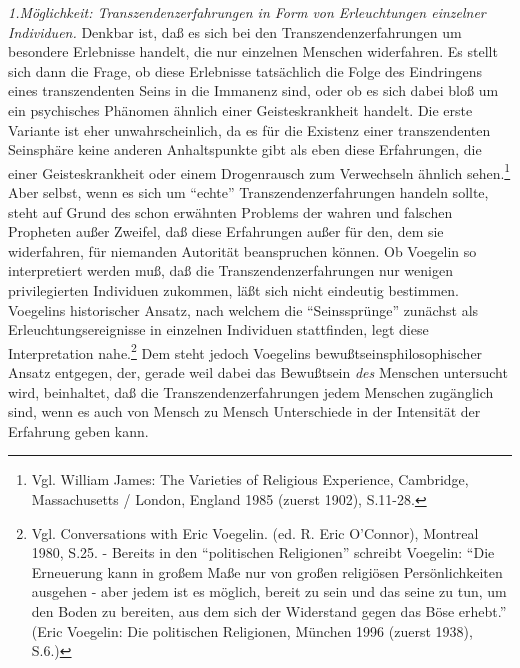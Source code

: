{\it 1.Möglichkeit: Transzendenzerfahrungen in Form von Erleuchtungen
  einzelner Individuen.} Denkbar ist, daß es sich bei den
Transzendenzerfahrungen um besondere Erlebnisse handelt, die nur einzelnen
Menschen widerfahren. Es stellt sich dann die Frage, ob diese Erlebnisse
tatsächlich die Folge des Eindringens eines transzendenten Seins in die
Immanenz sind, oder ob es sich dabei bloß um ein psychisches Phänomen ähnlich
einer Geisteskrankheit handelt. Die erste Variante ist eher unwahrscheinlich,
da es für die Existenz einer transzendenten Seinsphäre keine anderen
Anhaltspunkte gibt als eben diese Erfahrungen, die einer Geisteskrankheit oder
einem Drogenrausch zum Verwechseln ähnlich sehen.\footnote{Vgl. William James:
  The Varieties of Religious Experience, Cambridge, Massachusetts / London,
  England 1985 (zuerst 1902), S.11-28.} Aber selbst, wenn es sich um "`echte"'
Transzendenzerfahrungen handeln sollte, steht auf Grund des schon erwähnten
Problems der wahren und falschen Propheten außer Zweifel, daß diese
Erfahrungen außer für den, dem sie widerfahren, für niemanden Autorität
beanspruchen können. Ob Voegelin so interpretiert werden muß, daß die
Transzendenzerfahrungen nur wenigen privilegierten Individuen zukommen, läßt
sich nicht eindeutig bestimmen. Voegelins historischer Ansatz, nach welchem
die "`Seinssprünge"' zunächst als Erleuchtungsereignisse in einzelnen
Individuen stattfinden, legt diese Interpretation nahe.\footnote{Vgl.
  Conversations with Eric Voegelin. (ed. R. Eric O'Connor), Montreal 1980,
  S.25. - Bereits in den "`politischen Religionen"' schreibt Voegelin: "`Die
  Erneuerung kann in großem Maße nur von großen religiösen Persönlichkeiten
  ausgehen - aber jedem ist es möglich, bereit zu sein und das seine zu tun,
  um den Boden zu bereiten, aus dem sich der Widerstand gegen das Böse
  erhebt."' (Eric Voegelin: Die politischen Religionen, München 1996 (zuerst
  1938), S.6.)} Dem steht jedoch Voegelins bewußtseinsphilosophischer Ansatz
entgegen, der, gerade weil dabei das Bewußtsein {\it des} Menschen untersucht
wird, beinhaltet, daß die Transzendenzerfahrungen jedem Menschen zugänglich
sind, wenn es auch von Mensch zu Mensch Unterschiede in der Intensität der
Erfahrung geben kann.

